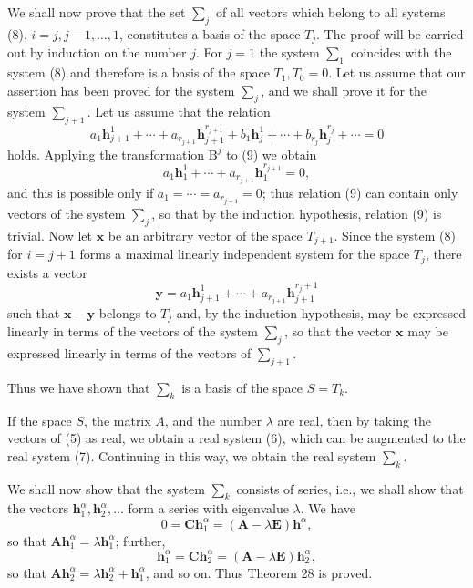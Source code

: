 \documentclass[10pt,a5paper]{book}
\makeatletter
\theoremstyle{plain}
\theoremstyle{definition}
\theoremstyle{remark}
\renewenvironment{proof}[1][\proofname]{\par
  \pushQED{\qed}%
  \normalfont\topsep6\p@\@plus6\p@\relax
  \trivlist
  \item\relax{\itshape #1\@addpunct{.}}\hspace\labelsep\ignorespaces
}{\popQED\endtrivlist\@endpefalse}
\makeatother
\begin{document}
\begin{proof}
We shall now prove that the set $\sum_{j}$ of all vectors which belong to all systems (8), $i=j, j-1, \ldots, 1$, constitutes a basis of the space $T_{j}$. The proof will be carried out by induction on the number $j$. For $j=1$ the system $\sum_{1}$ coincides with the system (8) and therefore is a basis of the space $T_{1}, T_{0}=0$. Let us assume that our assertion has been proved for the system $\sum_{j}$, and we shall prove it for the system $\sum_{j+1}$. Let us assume that the relation
\begin{equation*}
a_{1} \mathbf{h}_{j+1}^{1}+\cdots+a_{r_{j+1}} \mathbf{h}_{j+1}^{r_{j+1}}+b_{1} \mathbf{h}_{j}^{1}+\cdots+b_{r_{j}} \mathbf{h}_{j}^{r_{j}}+\cdots=0 \tag{9}
\end{equation*}
holds. Applying the transformation $\mathrm{B}^{j}$ to (9) we obtain
\[
a_{1} \mathbf{h}_{1}^{1}+\cdots+a_{r_{j+1}} \mathbf{h}_{1}^{r_{j+1}}=0,
\]
and this is possible only if $a_{1}=\cdots=a_{r_{j+1}}=0$; thus relation (9) can contain only vectors of the system $\sum_{j}$, so that by the induction hypothesis, relation (9) is trivial. Now let $\mathbf{x}$ be an arbitrary vector of the space $T_{j+1}$. Since the system (8) for $i=j+1$ forms a maximal linearly independent system for the space $T_{j}$, there exists a vector
\[
\mathbf{y}=a_{1} \mathbf{h}_{j+1}^{1}+\cdots+a_{r_{j+1}} \mathbf{h}_{j+1}^{r_{j}+1}
\]
such that $\mathbf{x}-\mathbf{y}$ belongs to $T_{j}$ and, by the induction hypothesis, may be expressed linearly in terms of the vectors of the system $\sum_{j}$, so that the vector $\mathbf{x}$ may be expressed linearly in terms of the vectors of $\sum_{j+1}$.

Thus we have shown that $\sum_{k}$ is a basis of the space $S=T_{k}$.

If the space $S$, the matrix $A$, and the number $\lambda$ are real, then by taking the vectors of (5) as real, we obtain a real system (6), which can be augmented to the real system (7). Continuing in this way, we obtain the real system $\sum_{k}$.

We shall now show that the system $\sum_{k}$ consists of series, i.e., we shall show that the vectors $\mathbf{h}_{1}^{\alpha}, \mathbf{h}_{2}^{\alpha}, \ldots$ form a series with eigenvalue $\lambda$. We have
\[
0=\mathbf{C} \mathbf{h}_{1}^{\alpha}=(\mathbf{A}-\lambda \mathbf{E}) \mathbf{h}_{1}^{\alpha},
\]
so that $\mathbf{A h}_{1}^{\alpha}=\lambda \mathbf{h}_{1}^{\alpha}$; further,
\[
\mathbf{h}_{1}^{\alpha}=\mathbf{C h}_{2}^{\alpha}=(\mathbf{A}-\lambda \mathbf{E}) \mathbf{h}_{2}^{\alpha},
\]
so that $\mathbf{A} \mathbf{h}_{2}^{\alpha}=\lambda \mathbf{h}_{2}^{\alpha}+\mathbf{h}_{1}^{\alpha}$, and so on. Thus Theorem 28 is proved.


\end{proof}
\end{document}
